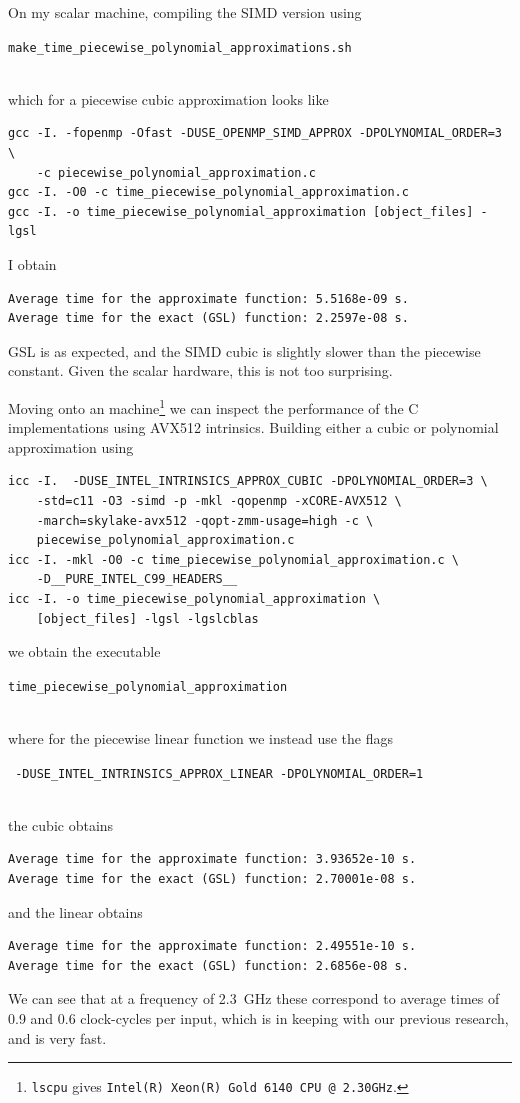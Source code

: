 \documentclass[11pt,a4paper,twoside,english]{extarticle}
\newcommand{\singlecodeline}[1]{\\[1em]\centerline{\lstinline[basicstyle=\ttfamily]$#1$}\\[1em]}
\begin{document}
On my scalar machine, compiling the \openmp SIMD version using \singlecodeline{make_time_piecewise_polynomial_approximations.sh} 
which for a piecewise cubic approximation looks like
\begin{verbatim}
gcc -I. -fopenmp -Ofast -DUSE_OPENMP_SIMD_APPROX -DPOLYNOMIAL_ORDER=3 \
    -c piecewise_polynomial_approximation.c
gcc -I. -O0 -c time_piecewise_polynomial_approximation.c
gcc -I. -o time_piecewise_polynomial_approximation [object_files] -lgsl
\end{verbatim}
I obtain
\begin{verbatim}
Average time for the approximate function: 5.5168e-09 s.
Average time for the exact (GSL) function: 2.2597e-08 s.
\end{verbatim}
GSL is as expected, and the SIMD cubic is slightly slower than the piecewise constant. Given the scalar hardware, this is not too surprising. 

Moving onto an \intel machine\footnote{\verb|lscpu| gives \verb|Intel(R) Xeon(R) Gold 6140 CPU @ 2.30GHz|.} we can inspect the performance of the C implementations using AVX512 intrinsics. Building either a cubic or polynomial approximation using
\begin{verbatim}
icc -I.  -DUSE_INTEL_INTRINSICS_APPROX_CUBIC -DPOLYNOMIAL_ORDER=3 \
    -std=c11 -O3 -simd -p -mkl -qopenmp -xCORE-AVX512 \
    -march=skylake-avx512 -qopt-zmm-usage=high -c \
    piecewise_polynomial_approximation.c 
icc -I. -mkl -O0 -c time_piecewise_polynomial_approximation.c \
    -D__PURE_INTEL_C99_HEADERS__
icc -I. -o time_piecewise_polynomial_approximation \
    [object_files] -lgsl -lgslcblas
\end{verbatim}
we obtain the executable
\singlecodeline{time_piecewise_polynomial_approximation} 
where for the piecewise linear function we instead use the flags \singlecodeline{ -DUSE_INTEL_INTRINSICS_APPROX_LINEAR -DPOLYNOMIAL_ORDER=1}
the cubic obtains
\begin{verbatim}
Average time for the approximate function: 3.93652e-10 s.
Average time for the exact (GSL) function: 2.70001e-08 s.
\end{verbatim}
and the linear obtains
\begin{verbatim}
Average time for the approximate function: 2.49551e-10 s.
Average time for the exact (GSL) function: 2.6856e-08 s.
\end{verbatim}
We can see that at a frequency of \SI{2.3}{\giga\hertz} these correspond to average times of 0.9 and 0.6 clock-cycles per input, which is in keeping with our previous research, and is very fast. 
\end{document}
